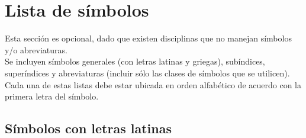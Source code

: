 \chapter*{Lista de símbolos}
Esta sección es opcional, dado que existen disciplinas que no manejan símbolos y/o abreviaturas.\\

Se incluyen símbolos generales (con letras latinas y griegas), subíndices, superíndices y abreviaturas (incluir sólo las clases de símbolos que se utilicen). Cada una de estas listas debe estar ubicada en orden alfabético de acuerdo con la primera letra del símbolo.
\section*{Símbolos con letras latinas}
 \label{simbolos}
 \renewcommand{\arraystretch}{1.3}
